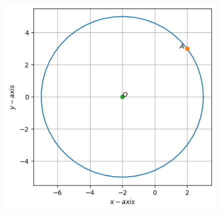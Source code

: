 \documentclass[12pt]{article}
\begin{document}
\begin{figure}[H]
\centering
\includegraphics[width=\columnwidth]{fig/11.11.1.13.1.png}
\caption{}
\label{fig:11.11.1.13.1}
\end{figure}
\end{document}
